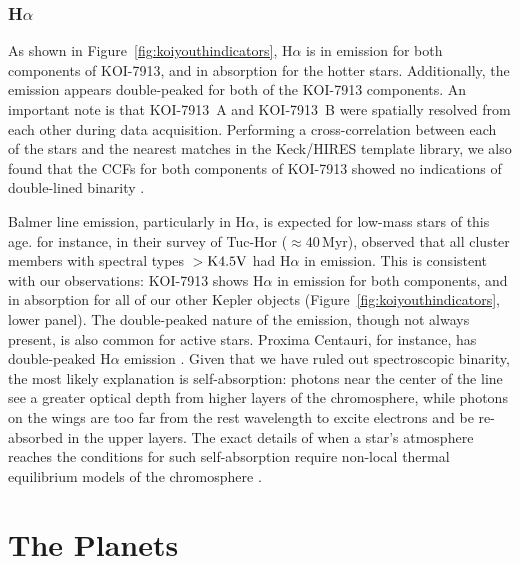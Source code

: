 \documentclass[12pt,twocolumn,tighten,linenumbers]{aastex63}
\begin{document}
\subsubsection{H$\alpha$}

As shown in Figure~\ref{fig:koiyouthindicators}, H$\alpha$ is in
emission for both components of KOI-7913, and in absorption for the
hotter stars.  Additionally, the emission appears double-peaked for
both of the KOI-7913 components.  An important note is that KOI-7913~A and
KOI-7913~B were spatially resolved from each other during data
acquisition.  Performing a cross-correlation between each of the stars
and the nearest matches in the Keck/HIRES template library, we also
found that the CCFs for both components of KOI-7913 showed no
indications of double-lined binarity \citep{kolbl_detection_2015}.

Balmer line emission, particularly in H$\alpha$, is expected for
low-mass stars of this age.  \citet{kraus_stellar_2014} for instance, in their
survey of Tuc-Hor ($\approx$40\,Myr), observed that all
cluster members with spectral types $>$${\rm K4.5V}$ had H$\alpha$ in
emission.  This is consistent with our observations: KOI-7913 shows
H$\alpha$ in emission for both components, and in absorption
for all of our other Kepler objects (Figure~\ref{fig:koiyouthindicators}, lower panel).  The double-peaked nature of the
emission, though not always present, is also common for
active stars.  Proxima Centauri, for instance, has double-peaked
H$\alpha$ emission \citep{collins_calculations_2017}.  Given
that we have ruled out spectroscopic binarity, the most
likely
explanation is self-absorption: photons near the center of the line
see a greater optical depth from higher layers of the chromosphere,
while photons on the wings are too far from the
rest wavelength to excite electrons and be re-absorbed in the upper
layers.  The exact details of when a star's atmosphere reaches the
conditions for such self-absorption require non-local thermal
equilibrium models of the chromosphere
\citep{short_chromospheric_1998,2005A&A...439.1137F}.







\section{The Planets}
\label{sec:planets}
\end{document}
